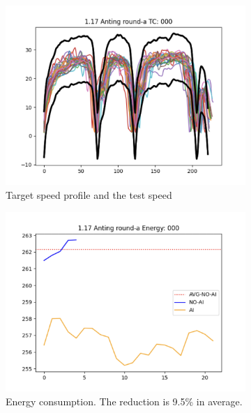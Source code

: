\documentclass{article}
\begin{document}
\begin{figure}[htbp]
	\centering
	\begin{subfigure}[t]{0.3\textwidth}
		\centering
		\includegraphics[width=\textwidth]{images/openroad_mm_000_velocity.png}
		\caption{Target speed profile and the test speed}\label{fig:openroad mm 000 velocity}
	\end{subfigure}
	\hfill
	\begin{subfigure}[t]{0.3\textwidth}
		\centering
		\includegraphics[width=\textwidth]{images/openroad_mm_000_consumption.png}
		\caption{Energy consumption. The reduction is 9.5\% in average.}\label{fig:openroad mm 000 consumption}
	\end{subfigure}
	\hfill
	\begin{subfigure}[t]{0.3\textwidth}

\end{subfigure}
\end{figure}
\end{document}
